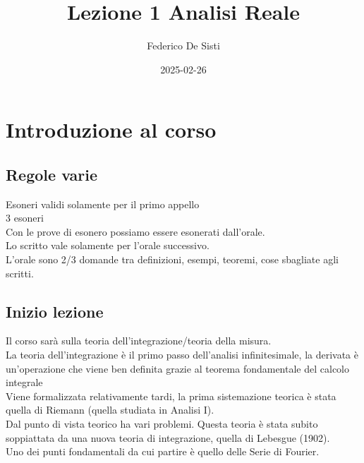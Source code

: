 \documentclass[12px]{article}
\title{Lezione 1 Analisi Reale}
\date{2025-02-26}
\author{Federico De Sisti}
\begin{document}
	\maketitle
	\newpage
	\section{Introduzione al corso}
	\subsection{Regole varie}
	Esoneri validi solamente per il primo appello\\
	3 esoneri\\
	Con le prove di esonero possiamo essere esonerati dall'orale.\\
	Lo scritto vale solamente per l'orale successivo.\\
	L'orale sono 2/3 domande tra definizioni, esempi, teoremi, cose sbagliate agli scritti.\\
	\subsection{Inizio lezione}
	Il corso sarà sulla teoria dell'integrazione/teoria della misura.\\
	La teoria dell'integrazione è il primo passo dell'analisi infinitesimale, la derivata è un'operazione che viene ben definita grazie al teorema fondamentale del calcolo integrale\\
	Viene formalizzata relativamente tardi, la prima sistemazione teorica è stata quella di Riemann (quella studiata in Analisi I).\\
	Dal punto di vista teorico ha vari problemi. Questa teoria è stata subito soppiattata da una nuova teoria di integrazione, quella di Lebesgue (1902).\\
	Uno dei punti fondamentali da cui partire è quello delle Serie di Fourier.\\
\end{document}
